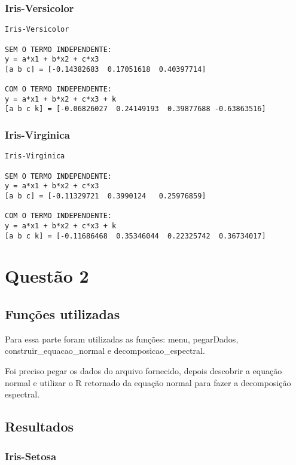 \documentclass[a4paper,12pt,twoside]{article}
\begin{document}
\subsubsection{Iris-Versicolor}
\begin{lstlisting}
Iris-Versicolor

SEM O TERMO INDEPENDENTE: 
y = a*x1 + b*x2 + c*x3
[a b c] = [-0.14382683  0.17051618  0.40397714]

COM O TERMO INDEPENDENTE: 
y = a*x1 + b*x2 + c*x3 + k
[a b c k] = [-0.06826027  0.24149193  0.39877688 -0.63863516]
\end{lstlisting}

\subsubsection{Iris-Virginica}
\begin{lstlisting}
Iris-Virginica

SEM O TERMO INDEPENDENTE: 
y = a*x1 + b*x2 + c*x3
[a b c] = [-0.11329721  0.3990124   0.25976859]

COM O TERMO INDEPENDENTE: 
y = a*x1 + b*x2 + c*x3 + k
[a b c k] = [-0.11686468  0.35346044  0.22325742  0.36734017]
\end{lstlisting}

\section{Questão 2}
\subsection{Funções utilizadas}
Para essa parte foram utilizadas as funções: menu, pegarDados, construir\_equacao\_normal e decomposicao\_espectral.

Foi preciso pegar os dados do arquivo fornecido, depois descobrir a equação normal e utilizar o R retornado da equação normal para fazer a decomposição espectral.
\subsection{Resultados}
\subsubsection {Iris-Setosa}
\end{document}
